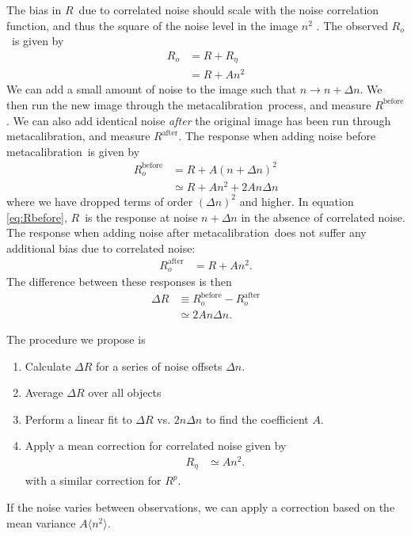 \documentclass[usegraphicx,usenatbib]{mn2e}
\newcommand{\mcal}{metacalibration}
\newcommand{\mcalR}{$R$}
\newcommand{\mcalRpsf}{$R^{p}$}
\newcommand{\mcalRo}{$R_o$}
\newcommand{\mcalRnoise}{$R_\eta$}
\begin{document}
The bias in \mcalR\ due to correlated noise should scale with the 
noise correlation function, and thus the square of the noise level
in the image $n^2$ \citep{HirataCorrNoise}.  The observed \mcalRo\
is given by
\begin{align} \label{eq:scaling}
    \mbox{\mcalRo} &= R + \mbox{\mcalRnoise}  \nonumber \\
                   &= R + A n^2
\end{align}
We can add a small amount of noise to the image
such that $n \rightarrow n + \Delta n$. We then run the new image
through the \mcal\ process, and measure $R^{\mathrm{before}}$.  We can also
add identical noise {\em after} the original image  has been run through \mcal, and
measure $R^{\mathrm{after}}$.  The response when adding noise before
\mcal\ is given by
\begin{align}\label{eq:Rbefore}
    R_o^{\mathrm{before}} &= R + A (n + \Delta n)^2 \nonumber \\
       &\simeq R + A n^2 + 2 A n \Delta n
\end{align}
where we have dropped terms of order $(\Delta n)^2$ and higher.  In equation
\ref{eq:Rbefore}, \mcalR\ is the response at noise $n+\Delta n$ in the absence
of correlated noise.  The response when adding noise after \mcal\ does
not suffer any additional bias due to correlated noise:
\begin{align}
    R_o^{\mathrm{after}} &= R + A n^2.
\end{align}
The difference between these responses is then 
\begin{align}
    \Delta R &\equiv R_o^{\mathrm{before}} - R_o^{\mathrm{after}}  \nonumber \\
             &\simeq 2 A n \Delta n.
\end{align}

The procedure we propose is 
\begin{enumerate}
    \item Calculate $\Delta R$ for a series of noise offsets $\Delta n$.
    \item Average $\Delta R$ over all objects
    \item Perform a linear fit to $\Delta R$ vs. $2 n \Delta n$ to find the 
        coefficient $A$.
    \item Apply a mean correction for correlated noise given by
        \begin{align}
            \mbox{\mcalRnoise} & \simeq A n^2.
        \end{align}
        with a similar correction for \mcalRpsf.
\end{enumerate}
If the noise varies between observations, we can apply a 
correction based on the mean variance $A
\langle n^2 \rangle$.
\end{document}
